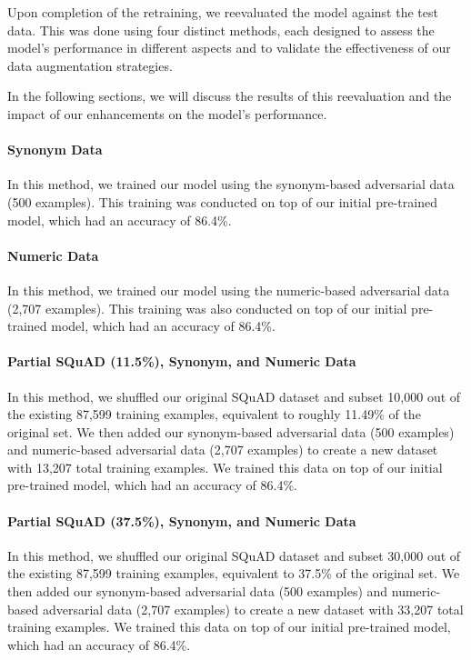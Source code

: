 \documentclass{article}
\begin{document}
Upon completion of the retraining, we reevaluated the model against the test
data. This was done using four distinct methods, each designed to assess the
model's performance in different aspects and to validate the effectiveness
of our data augmentation strategies.

In the following sections, we will discuss the results of this reevaluation
and the impact of our enhancements on the model's performance.

\paragraph{Synonym Data}

In this method, we trained our model using the synonym-based adversarial data
(500 examples). This training was conducted on top of our initial pre-trained
model, which had an accuracy of 86.4\%.

\paragraph{Numeric Data}

In this method, we trained our model using the numeric-based adversarial data
(2,707 examples). This training was also conducted on top of our initial
pre-trained model, which had an accuracy of 86.4\%.

\paragraph{Partial SQuAD (11.5\%), Synonym, and Numeric Data}

In this method, we shuffled our original SQuAD dataset and subset 10,000 out
of the existing 87,599 training examples, equivalent to roughly 11.49\% of the
original set. We then added our synonym-based adversarial data (500 examples)
and numeric-based adversarial data (2,707 examples) to create a new dataset
with 13,207 total training examples. We trained this data on top of our
initial pre-trained model, which had an accuracy of 86.4\%.

\paragraph{Partial SQuAD (37.5\%), Synonym, and Numeric Data}

In this method, we shuffled our original SQuAD dataset and subset 30,000 out
of the existing 87,599 training examples, equivalent to 37.5\% of the original
set. We then added our synonym-based adversarial data (500 examples) and
numeric-based adversarial data (2,707 examples) to create a new dataset with
33,207 total training examples. We trained this data on top of our initial
pre-trained model, which had an accuracy of 86.4\%.
\end{document}
